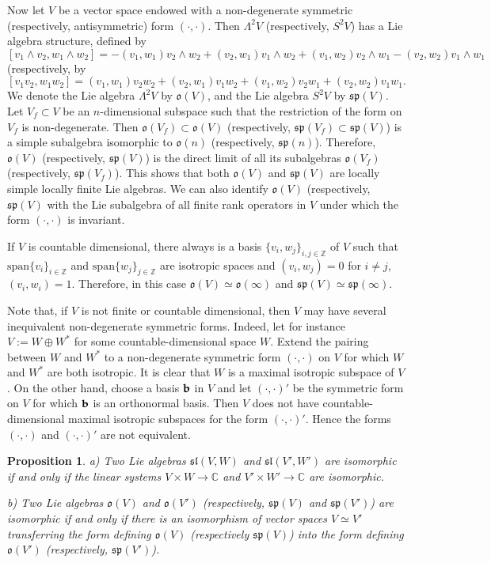 \documentclass{svmult}
\newtheorem{prop}[theo]{Proposition}
\newcommand {\ZZ} {\mathbb {Z}}
\newcommand {\CC} {\mathbb {C}}
\renewcommand{\sp}{\mathfrak{sp}}
\renewcommand{\sl}{\mathfrak{sl}}
\newcommand{\oo}{\mathfrak{o}}
\renewcommand{\span}{\mathrm{span}}
\begin{document}
Now  let $V$ be a vector space endowed with a non-degenerate symmetric (respectively, antisymmetric) form $(\cdot,\cdot)$. 
Then $\Lambda^2V$ (respectively, $S^2V$) has a Lie algebra structure, defined by 
$$[v_1\wedge v_2,w_1\wedge w_2]=-(v_1,w_1)v_2\wedge w_2+(v_2,w_1)v_1\wedge w_2 +(v_1,w_2)v_2\wedge w_1-(v_2,w_2)v_1\wedge w_1$$ 
(respectively, by $$[v_1 v_2,w_1 w_2]=(v_1,w_1)v_2 w_2+(v_2,w_1)v_1 w_2 +(v_1,w_2)v_2 w_1+(v_2,w_2)v_1 w_1.$$ 
We denote the Lie algebra  $\Lambda^2V$ by $\oo(V)$, and the Lie algebra $S^2V$ by $\sp(V)$. Let $V_f\subset V$ be an $n$-dimensional subspace such that the 
restriction of the form on $V_f$ is non-degenerate. Then $\oo(V_f)\subset \oo(V)$ (respectively, $\sp(V_f)\subset \sp(V)$) is a simple subalgebra 
isomorphic to $\oo(n)$ (respectively, $\sp(n)$). Therefore, $\oo(V)$ (respectively, $\sp(V)$) is the direct limit of all its subalgebras $\oo(V_f)$ 
(respectively, $\sp(V_f)$). This shows that both $\oo(V)$ and $\sp(V)$ are locally simple locally 
finite Lie algebras. We can also identify $\oo(V)$ (respectively, $\sp(V)$ with the Lie subalgebra of all finite rank operators in $V$ under which the form  
$(\cdot,\cdot)$ is invariant.

If $V$ is countable dimensional, there always is a basis $\lbrace v_i,w_j\rbrace_{i,j \in \ZZ}$ of $V$ such that $\span\lbrace v_i\rbrace_{i \in \ZZ}$ and $\span\lbrace w_j\rbrace_{j \in \ZZ}$ are isotropic spaces and $(v_i, w_j) = 0$ for $i \neq j$, $(v_i, w_i)=1$. Therefore, in this case $\oo(V) \simeq \oo(\infty)$ and  $\sp(V)\simeq \sp(\infty)$.

Note that, if $V$ is not finite or countable dimensional, then $V$ may have several inequivalent 
non-degenerate symmetric forms. Indeed, let for instance $V:=W\oplus W^*$ for some countable-dimensional space $W$. Extend the pairing between $W$ and $W^*$ to a 
non-degenerate symmetric form $(\cdot,\cdot)$ on $V$ for which $W$ and $W^*$ are both isotropic. It is clear that $W$ is a maximal isotropic subspace of $V$. 
On the other hand, choose a basis $\bf b$ in $V$ and let $(\cdot,\cdot)'$ be the symmetric form on $V$ for which $\bf b$ is an orthonormal basis. Then 
$V$ does not have countable-dimensional maximal isotropic subspaces for the form $(\cdot,\cdot)'$. Hence the forms $(\cdot,\cdot)$ and $(\cdot,\cdot)'$  are 
not equivalent.



\begin{prop}\label{prop:1.29.9}
a) Two Lie algebras $\sl(V,W)$ and $\sl(V',W')$ are isomorphic if and only if the linear systems $V\times W\rightarrow \CC$ and 
$V' \times W' \rightarrow \CC$ are isomorphic.

b) Two Lie algebras $\oo(V)$ and $\oo(V')$ (respectively, $\sp(V)$ and $\sp(V')$) are isomorphic if and only if there is an isomorphism of vector spaces 
$V\simeq V'$ transferring the form defining $\oo(V)$ (respectively $\sp(V)$) into the form defining $\oo(V')$ (respectively, $\sp(V')$).

\end{prop}
\end{document}
